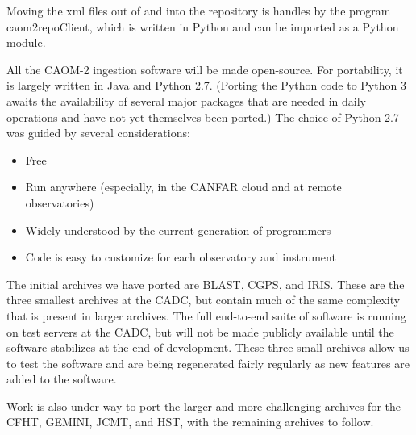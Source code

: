 \documentclass[11pt,twoside]{article}
\begin{document}
Moving the xml files out of and into the repository is handles by the program caom2repoClient, which is written in Python and can be imported as a Python module.
 
All the CAOM-2 ingestion software will be made open-source.  For portability, it is largely written in Java and Python 2.7.  (Porting the Python code to Python 3 awaits the availability of several major packages that are needed in daily operations and have not yet themselves been ported.) 
The choice of Python 2.7 was guided by several considerations:
\begin{itemize}
\item Free
\item Run anywhere (especially, in the CANFAR cloud and at remote observatories)
\item Widely understood by the current generation of programmers
\item Code is easy to customize for each observatory and instrument
\end{itemize}

The initial archives we have ported are BLAST, CGPS, and IRIS.  These are the three smallest archives at the CADC, but contain much of the same complexity that is present in larger archives.  The full end-to-end suite of software is running on test servers at the CADC, but will not be made publicly available until the software stabilizes at the end of development.  These three small archives allow us to test the software and are being regenerated fairly regularly as new features are added to the software.

Work is also under way to port the larger and more challenging archives for the CFHT, GEMINI, JCMT, and HST, with the remaining archives to follow.



\end{document}
